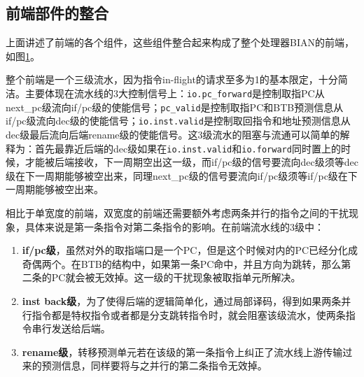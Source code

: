 \subsection{前端部件的整合}
上面讲述了前端的各个组件，这些组件整合起来构成了整个处理器BIAN的前端，如图\ref{fig:frontend}。
\begin{figure}[!htbp]
	\centering
	\label{fig:frontend}
\end{figure}

整个前端是一个三级流水，因为指令in-flight的请求至多为1的基本限定，十分简洁。主要体现在流水线的3大控制信号上：\texttt{io.pc\_forward}是控制取指PC从next\_pc级流向if/pc级的使能信号；\texttt{pc\_valid}是控制取指PC和BTB预测信息从if/pc级流向dec级的使能信号；\texttt{io.inst.valid}是控制取回指令和地址预测信息从dec级最后流向后端rename级的使能信号。这3级流水的阻塞与流通可以简单的解释为：首先最靠近后端的dec级如果在\texttt{io.inst.valid}和\texttt{io.forward}同时置上的时候，才能被后端接收，下一周期空出这一级，而if/pc级的信号要流向dec级须等dec级在下一周期能够被空出来，同理next\_pc级的信号要流向if/pc级须等if/pc级在下一周期能够被空出来。

相比于单宽度的前端，双宽度的前端还需要额外考虑两条并行的指令之间的干扰现象，具体来说是第一条指令对第二条指令的影响。在前端流水线的3级中：
\begin{enumerate}
	\item \textbf{if/pc级}，虽然对外的取指端口是一个PC，但是这个时候对内的PC已经分化成奇偶两个。在BTB的结构中，如果第一条PC命中，并且方向为跳转，那么第二条的PC就会被无效掉。这一级的干扰现象被取指单元所解决。
	\item \textbf{inst back级}，为了使得后端的逻辑简单化，通过局部译码，得到如果两条并行指令都是特权指令或者都是分支跳转指令时，就会阻塞该级流水，使两条指令串行发送给后端。
	\item \textbf{rename级}，转移预测单元若在该级的第一条指令上纠正了流水线上游传输过来的预测信息，同样要将与之并行的第二条指令无效掉。
\end{enumerate}

